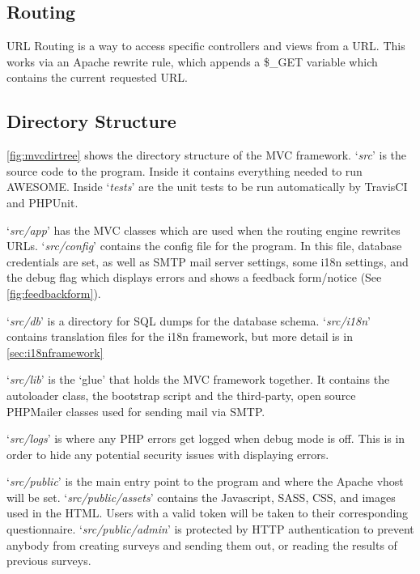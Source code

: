 	\subsection{Routing}
	
	URL Routing is a way to access specific controllers and views from a URL.
	This works via an Apache rewrite rule, which appends a \$\_GET variable which contains the current requested URL.
	
	\subsection{Directory Structure}
	
	\autoref{fig:mvcdirtree} shows the directory structure of the \ac{MVC} framework. `\textit{src}' is the source code to the program. Inside it contains everything needed to run \ac{AWESOME}.
	Inside `\textit{tests}' are the unit tests to be run automatically by TravisCI and PHPUnit.
	
	`\textit{src/app}' has the MVC classes which are used when the routing engine rewrites URLs.
	`\textit{src/config}' contains the config file for the program.
	In this file, database credentials are set, as well as SMTP mail server settings, some \ac{i18n} settings, and the debug flag which displays errors and shows a feedback form/notice (See \autoref{fig:feedbackform}).
	
	`\textit{src/db}' is a directory for \ac{SQL} dumps for the database schema.
	`\textit{src/i18n}' contains translation files for the \ac{i18n} framework, but more detail is in \autoref{sec:i18nframework}
	
	`\textit{src/lib}' is the `glue' that holds the MVC framework together.
	It contains the autoloader class, the bootstrap script and the third-party, open source PHPMailer\cite{phpmailer} classes used for sending mail via SMTP.
	
	`\textit{src/logs}' is where any PHP errors get logged when debug mode is off. This is in order to hide any potential security issues with displaying errors.
	
	`\textit{src/public}' is the main entry point to the program and where the Apache vhost will be set.
	`\textit{src/public/assets}' contains the Javascript, SASS, CSS, and images used in the HTML.
	Users with a valid token will be taken to their corresponding questionnaire.
	`\textit{src/public/admin}' is protected by HTTP authentication to prevent anybody from creating surveys and sending them out, or reading the results of previous surveys.
	
